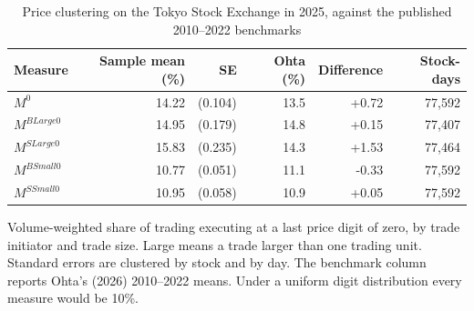 \begin{table}[htbp]
\centering
\caption{Price clustering on the Tokyo Stock Exchange in 2025, against the published 2010--2022 benchmarks}
\label{tab:stylized}
\small
\begin{threeparttable}
\begin{tabular}{@{}lrrrrr@{}}
\toprule
Measure & Sample mean (\%) & SE & Ohta (\%) & Difference & Stock-days \\
\midrule
$M^{0}$ & 14.22 & (0.104) & 13.5 & +0.72 & 77,592 \\
$M^{BLarge0}$ & 14.95 & (0.179) & 14.8 & +0.15 & 77,407 \\
$M^{SLarge0}$ & 15.83 & (0.235) & 14.3 & +1.53 & 77,464 \\
$M^{BSmall0}$ & 10.77 & (0.051) & 11.1 & -0.33 & 77,592 \\
$M^{SSmall0}$ & 10.95 & (0.058) & 10.9 & +0.05 & 77,592 \\
\bottomrule
\end{tabular}
\begin{tablenotes}[flushleft]\footnotesize
\item Volume-weighted share of trading executing at a last price digit of zero, by trade initiator and trade size. Large means a trade larger than one trading unit. Standard errors are clustered by stock and by day. The benchmark column reports Ohta's (2026) 2010--2022 means. Under a uniform digit distribution every measure would be 10\%.
\end{tablenotes}
\end{threeparttable}
\end{table}
